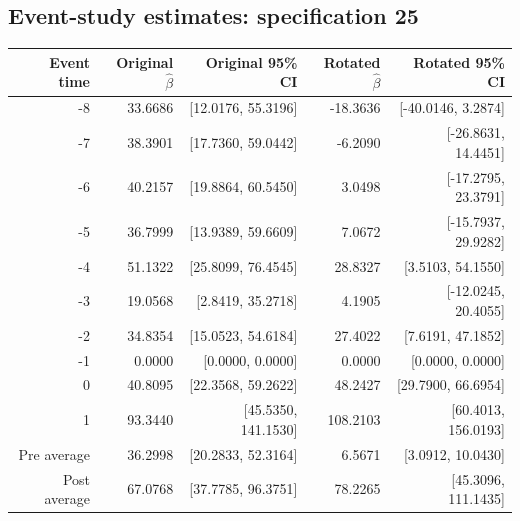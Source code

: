 \documentclass[10pt]{article}
\begin{document}
\subsection*{Event-study estimates: specification 25}
\begin{center}\scriptsize
\begin{tabular}{r rr rr}
\toprule
Event time & Original $\hat\beta$ & Original 95\% CI & Rotated $\hat\beta$ & Rotated 95\% CI \\
\midrule
-8 & 33.6686 & [12.0176, 55.3196] & -18.3636 & [-40.0146, 3.2874] \\
-7 & 38.3901 & [17.7360, 59.0442] & -6.2090 & [-26.8631, 14.4451] \\
-6 & 40.2157 & [19.8864, 60.5450] & 3.0498 & [-17.2795, 23.3791] \\
-5 & 36.7999 & [13.9389, 59.6609] & 7.0672 & [-15.7937, 29.9282] \\
-4 & 51.1322 & [25.8099, 76.4545] & 28.8327 & [3.5103, 54.1550] \\
-3 & 19.0568 & [2.8419, 35.2718] & 4.1905 & [-12.0245, 20.4055] \\
-2 & 34.8354 & [15.0523, 54.6184] & 27.4022 & [7.6191, 47.1852] \\
-1 & 0.0000 & [0.0000, 0.0000] & 0.0000 & [0.0000, 0.0000] \\
0 & 40.8095 & [22.3568, 59.2622] & 48.2427 & [29.7900, 66.6954] \\
1 & 93.3440 & [45.5350, 141.1530] & 108.2103 & [60.4013, 156.0193] \\
\midrule
Pre average & 36.2998 & [20.2833, 52.3164] & 6.5671 & [3.0912, 10.0430] \\
Post average & 67.0768 & [37.7785, 96.3751] & 78.2265 & [45.3096, 111.1435] \\
\bottomrule
\end{tabular}
\end{center}
\clearpage
\end{document}

